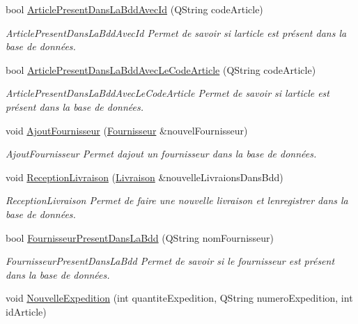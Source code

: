 \begin{DoxyCompactItemize}
bool \mbox{\hyperlink{class_database_a84330285ff6131c5d496d9b7d8b277b1}{Article\+Present\+Dans\+La\+Bdd\+Avec\+Id}} (Q\+String code\+Article)
\begin{DoxyCompactList}\small\item\em Article\+Present\+Dans\+La\+Bdd\+Avec\+Id Permet de savoir si l\textquotesingle{}article est présent dans la base de données. \end{DoxyCompactList}\item 
bool \mbox{\hyperlink{class_database_a5965471d637e973abba80f63f6aecb8d}{Article\+Present\+Dans\+La\+Bdd\+Avec\+Le\+Code\+Article}} (Q\+String code\+Article)
\begin{DoxyCompactList}\small\item\em Article\+Present\+Dans\+La\+Bdd\+Avec\+Le\+Code\+Article Permet de savoir si l\textquotesingle{}article est présent dans la base de données. \end{DoxyCompactList}\item 
void \mbox{\hyperlink{class_database_a4ec01a690278809aa48a1c2c3ce6001d}{Ajout\+Fournisseur}} (\mbox{\hyperlink{class_fournisseur}{Fournisseur}} \&nouvel\+Fournisseur)
\begin{DoxyCompactList}\small\item\em Ajout\+Fournisseur Permet d\textquotesingle{}ajout un fournisseur dans la base de données. \end{DoxyCompactList}\item 
void \mbox{\hyperlink{class_database_a0c0cd5c7401905883258019cdd18f6bd}{Reception\+Livraison}} (\mbox{\hyperlink{class_livraison}{Livraison}} \&nouvelle\+Livraions\+Dans\+Bdd)
\begin{DoxyCompactList}\small\item\em Reception\+Livraison Permet de faire une nouvelle livraison et l\textquotesingle{}enregistrer dans la base de données. \end{DoxyCompactList}\item 
bool \mbox{\hyperlink{class_database_a83a103a11c2b982427ffae7eb11ea167}{Fournisseur\+Present\+Dans\+La\+Bdd}} (Q\+String nom\+Fournisseur)
\begin{DoxyCompactList}\small\item\em Fournisseur\+Present\+Dans\+La\+Bdd Permet de savoir si le fournisseur est présent dans la base de données. \end{DoxyCompactList}\item 
void \mbox{\hyperlink{class_database_a6ba85382af93e1bc7cb32e84f6fcea3b}{Nouvelle\+Expedition}} (int quantite\+Expedition, Q\+String numero\+Expedition, int id\+Article)

\end{DoxyCompactItemize}

